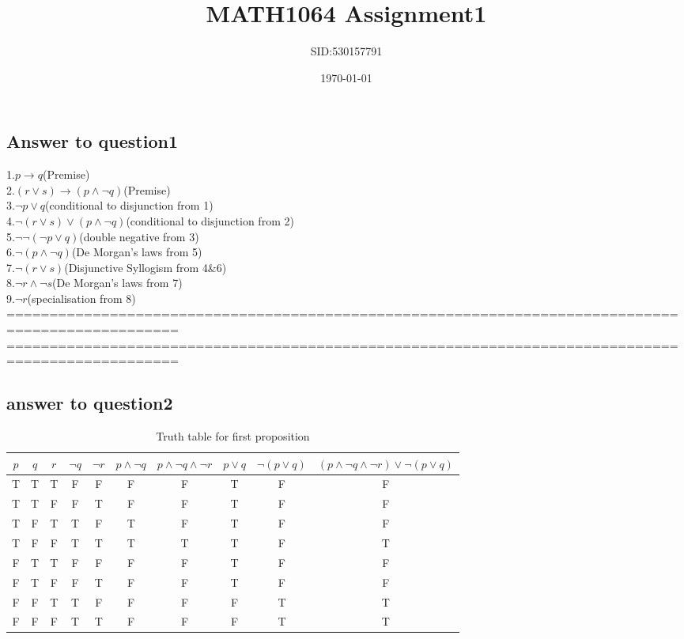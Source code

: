 \documentclass[12pt,a4paper]{article}
\title{MATH1064 Assignment1}
\author{SID:530157791}
\date{\today}
\begin{document}
\maketitle


\subsection*{Answer to question1}
1.$p \rightarrow q$\qquad\qquad(Premise)\\
2.$(r \lor s) \rightarrow (p \land \neg q)$\qquad\qquad(Premise)\\
3.$\neg p \lor q$\qquad\qquad(conditional to disjunction from 1)\\
4.$\neg (r \lor s) \lor (p \land \neg q)$\qquad\qquad(conditional to disjunction from 2)\\
5.$\neg \neg (\neg p \lor q)$\qquad\qquad(double negative from 3)\\
6.$\neg (p \land \neg q)$\qquad\qquad(De Morgan’s laws from 5)\\
7.$\neg (r \lor s)$\qquad\qquad(Disjunctive Syllogism from 4\&6)\\
8.$\neg r \land \neg s$\qquad\qquad(De Morgan’s laws from 7)\\
9.$\neg r$\qquad\qquad(specialisation from 8)\\


==================================================================================================
\newpage
==================================================================================================

\subsection*{answer to question2}

\begin{table}[h]
\centering
\begin{tabular}{|c|c|c|c|c|c|c|c|c|c|}
\hline
\( p \) & \( q \) & \( r \) & \( \neg q \) & \( \neg r \) & \( p \land \neg q \)&\( p \land \neg q \land \neg r \) & \(p \lor q\)& \( \neg (p \lor q) \) & \( (p \land \neg q \land \neg r) \lor \neg (p \lor q) \) \\
\hline
T & T & T & F & F & F & F & T& F & F \\
T & T & F & F & T & F & F & T& F & F \\
T & F & T & T & F & T & F & T& F & F \\
T & F & F & T & T & T & T & T& F & T \\
F & T & T & F & F & F & F & T& F & F \\
F & T & F & F & T & F & F & T& F & F \\
F & F & T & T & F & F & F & F& T & T \\
F & F & F & T & T &  F & F & F& T & T \\
\hline
\end{tabular}
\caption{Truth table for first proposition}
\end{table}
\end{document}
